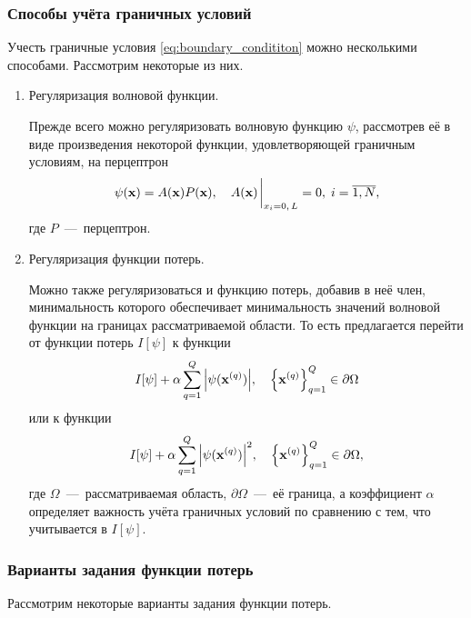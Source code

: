\documentclass[11pt]{article}
\numberwithin{equation}{section}
\begin{document}
\subsubsection{Способы учёта граничных условий}

Учесть граничные условия \eqref{eq:boundary_condititon} можно несколькими способами. Рассмотрим некоторые из них. 
\begin{enumerate}
	\item Регуляризация волновой функции.
	
	Прежде всего можно регуляризовать волновую функцию $\psi$, рассмотрев её в виде произведения некоторой функции, удовлетворяющей граничным условиям, на перцептрон
	\begin{equation}
		\psi(\vb{x}) = A(\vb{x}) P(\vb{x}),\quad A(\vb{x})\eval_{x_i=0,\, L} = 0,\; i=\overline{1,N},
	\end{equation}
	где $P$~---~перцептрон.
	
	\item Регуляризация функции потерь.

	Можно также регуляризоваться и функцию потерь, добавив в неё член, минимальность которого обеспечивает минимальность значений волновой функции на границах рассматриваемой области. То есть предлагается перейти от функции потерь $I[\psi]$ к функции
	\begin{equation}
	 I[\psi] + \alpha \sum_{q=1}^{Q} \abs{\psi(\vb{x}^{(q)})},\quad \qty{\vb{x}^{(q)}}_{q=1}^Q \in \partial \Omega
	\end{equation}
	или к функции
	\begin{equation}
	 I[\psi] + \alpha \sum_{q=1}^{Q} \abs{\psi(\vb{x}^{(q)})}^2,\quad \qty{\vb{x}^{(q)}}_{q=1}^Q \in \partial \Omega,
	\end{equation}
	где $\Omega$~---~рассматриваемая область, $\partial \Omega$~---~её граница, а коэффициент $\alpha$ определяет важность учёта граничных условий по сравнению с тем, что учитывается в $I[\psi]$.
\end{enumerate}

\subsubsection{Варианты задания функции потерь}

Рассмотрим некоторые варианты задания функции потерь.
\end{document}

